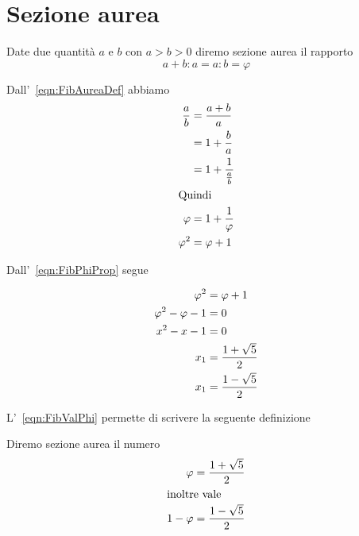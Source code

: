 \section{Sezione aurea}
\begin{defn}
	Date due quantità $a$ e $b$ con $a>b>0$ diremo sezione aurea il rapporto
	\begin{equation}
		a+b:a=a:b=\varphi
	\end{equation}\label{eqn:FibAureaDef}
\end{defn}
\begin{prop}
	Dall'~\vref{eqn:FibAureaDef} abbiamo
	\begin{align}
		\dfrac{a}{b}={} & \dfrac{a+b}{a}\notag                       \\
		={}             & 1+\dfrac{b}{a}\notag                       \\
		={}             & 1+\dfrac{1}{\frac{a}{b}}\notag             \\
		\intertext{Quindi}
		\varphi={}      & 1+\dfrac{1}{\varphi}\label{eqn:FibPhiProp} \\
		\varphi^2={}    & \varphi+1\notag
	\end{align}
\end{prop}
Dall'~\vref{eqn:FibPhiProp} segue
\begin{prop}
	\begin{align}
		\varphi^2={}           & \varphi+1\notag                            \\
		\varphi^2-\varphi-1={} & 0\notag                                    \\
		x^2-x-1={}             & 0\label{eqn:FibValPhiEqua}                 \\
		x_1={}                 & \dfrac{1+\sqrt{5}}{2}\label{eqn:FibValPhi} \\
		x_1={}                 & \dfrac{1-\sqrt{5}}{2}\notag
	\end{align}
\end{prop}
L'~\vref{eqn:FibValPhi} permette di scrivere la seguente definizione
\begin{defn}
	Diremo sezione aurea il numero
	\begin{align*}
		\varphi={}    & \dfrac{1+\sqrt{5}}{2} \\
		\intertext{inoltre vale}
		1-	\varphi={} & \dfrac{1-\sqrt{5}}{2} \\
	\end{align*}
\end{defn}
